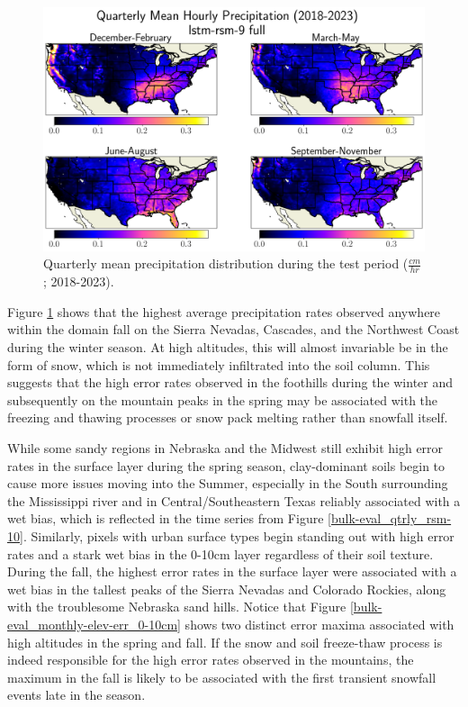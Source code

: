 \begin{figure}[h!]
    \centering

    \includegraphics[width=.99\linewidth,draft=false]{figures/grid-eval_qtrly/eval-grid_full_lstm-rsm-9_pixelwise-time-stats_abs-err_qtrly-horizon-apcp.png}

    \caption{Quarterly mean precipitation distribution during the test period ($\frac{cm}{hr}$; 2018-2023).}
    \label{bulk-eval_qtrly-precip}
\end{figure}

Figure \ref{bulk-eval_qtrly-precip} shows that the highest average precipitation rates observed anywhere within the domain fall on the Sierra Nevadas, Cascades, and the Northwest Coast during the winter season. At high altitudes, this will almost invariable be in the form of snow, which is not immediately infiltrated into the soil column. This suggests that the high error rates observed in the foothills during the winter and subsequently on the mountain peaks in the spring may be associated with the freezing and thawing processes or snow pack melting rather than snowfall itself.

While some sandy regions in Nebraska and the Midwest still exhibit high error rates in the surface layer during the spring season, clay-dominant soils begin to cause more issues moving into the Summer, especially in the South surrounding the Mississippi river and in Central/Southeastern Texas reliably associated with a wet bias, which is reflected in the time series from Figure \ref{bulk-eval_qtrly_rsm-10}. Similarly, pixels with urban surface types begin standing out with high error rates and a stark wet bias in the 0-10cm layer regardless of their soil texture. During the fall, the highest error rates in the surface layer were associated with a wet bias in the tallest peaks of the Sierra Nevadas and Colorado Rockies, along with the troublesome Nebraska sand hills. Notice that Figure \ref{bulk-eval_monthly-elev-err_0-10cm} shows two distinct error maxima associated with high altitudes in the spring and fall. If the snow and soil freeze-thaw process is indeed responsible for the high error rates observed in the mountains, the maximum in the fall is likely to be associated with the first transient snowfall events late in the season.


